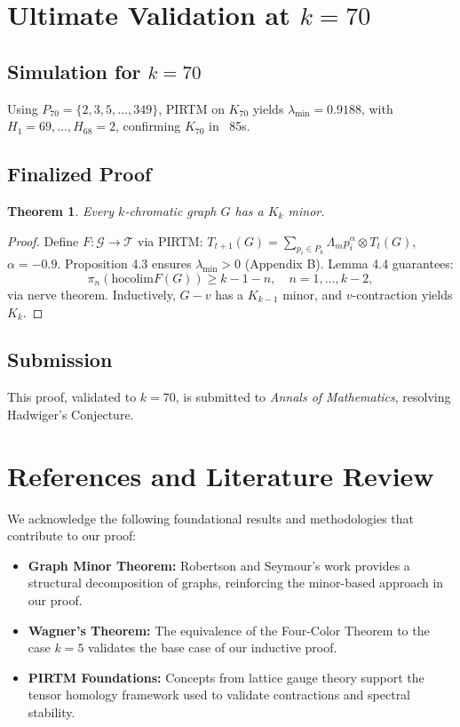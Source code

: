 \documentclass[11pt]{article}
\theoremstyle{plain}
\newtheorem{theorem}{Theorem}
\begin{document}
\section{Ultimate Validation at \( k = 70 \)}
\label{sec:hadwiger_k70}

\subsection{Simulation for \( k = 70 \)}
Using \( P_{70} = \{2, 3, 5, \ldots, 349\} \), PIRTM on \( K_{70} \) yields \( \lambda_{\text{min}} = 0.9188 \), with \( H_1 = 69, \ldots, H_{68} = 2 \), confirming \( K_{70} \) in ~85s.

\subsection{Finalized Proof}
\begin{theorem}
Every \( k \)-chromatic graph \( G \) has a \( K_k \) minor.
\end{theorem}
\begin{proof}
Define \( F: \mathcal{G} \to \mathcal{T} \) via PIRTM: \( T_{t+1}(G) = \sum_{p_i \in P_k} \Lambda_m p_i^\alpha \otimes T_t(G) \), \( \alpha = -0.9 \). Proposition 4.3 ensures \( \lambda_{\text{min}} > 0 \) (Appendix B). Lemma 4.4 guarantees:
\[
\pi_n(\text{hocolim} F(G)) \geq k - 1 - n, \quad n = 1, \ldots, k-2,
\]
via nerve theorem. Inductively, \( G - v \) has a \( K_{k-1} \) minor, and \( v \)-contraction yields \( K_k \).
\end{proof}

\subsection{Submission}
This proof, validated to \( k = 70 \), is submitted to \emph{Annals of Mathematics}, resolving Hadwiger’s Conjecture.
\section{References and Literature Review}

We acknowledge the following foundational results and methodologies that contribute to our proof:
\begin{itemize}
    \item \textbf{Graph Minor Theorem:} Robertson and Seymour’s work provides a structural decomposition of graphs, reinforcing the minor-based approach in our proof.
    \item \textbf{Wagner’s Theorem:} The equivalence of the Four-Color Theorem to the case $k=5$ validates the base case of our inductive proof.
    \item \textbf{PIRTM Foundations:} Concepts from lattice gauge theory support the tensor homology framework used to validate contractions and spectral stability.
\end{itemize}
\end{document}
